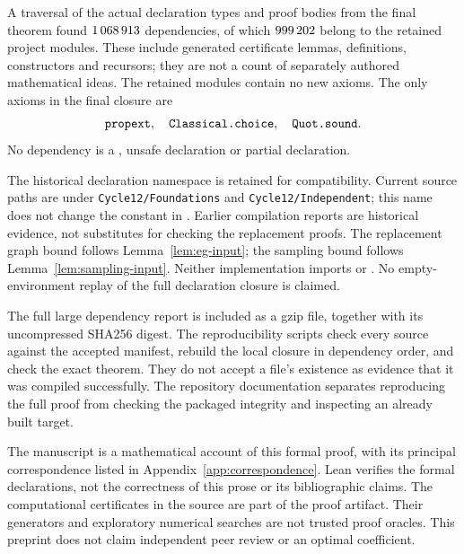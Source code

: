 A traversal of the actual declaration types and proof bodies from the
final theorem found $1\,068\,913$ dependencies, of which
$999\,202$ belong to the retained project modules.
These include generated certificate lemmas, definitions, constructors and
recursors; they are not a count of separately authored mathematical ideas.
The retained modules contain no new axioms. The only axioms in the final
closure are
\[
              \mcode{propext},\quad\mcode{Classical.choice},\quad
              \mcode{Quot.sound}.
\]
No dependency is a , unsafe declaration or partial declaration.


The historical declaration namespace  is retained for
compatibility. Current source paths are under \nolinkurl{Cycle12/Foundations}
and \nolinkurl{Cycle12/Independent}; this name does not change the constant
in . Earlier compilation reports are historical
evidence, not substitutes for checking the replacement proofs.
The replacement graph bound follows Lemma~\ref{lem:eg-input}; the sampling
bound follows Lemma~\ref{lem:sampling-input}. Neither implementation imports
 or .
No empty-environment replay of the full declaration closure is claimed.

The full large dependency report is included as a gzip file, together with
its uncompressed SHA256 digest. The reproducibility scripts check every
source against the accepted manifest, rebuild the local closure in dependency
order, and check the exact theorem. They do not accept a file's existence
as evidence that it was compiled successfully. The repository documentation
separates reproducing the full proof from checking the packaged integrity
and inspecting an already built target.

The manuscript is a mathematical account of this formal proof, with its
principal correspondence listed in Appendix~\ref{app:correspondence}.
Lean verifies the formal declarations, not the correctness of this prose or
its bibliographic claims. The computational certificates in the source are
part of the proof artifact. Their generators and exploratory numerical
searches are not trusted proof oracles. This preprint does not claim
independent peer review or an optimal coefficient.
